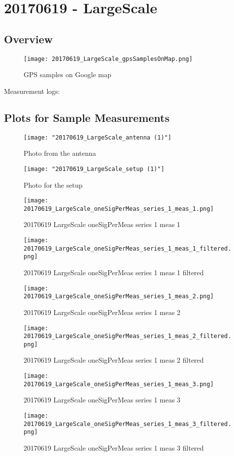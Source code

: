 \section{20170619 - LargeScale}
\subsection{Overview}
\begin{figure}[ht] \caption{GPS samples on Google map}
\texttt{[image: 20170619\_LargeScale\_gpsSamplesOnMap.png]}\centering\end{figure}
\begin{minipage}{\textwidth} Measurement logs:

 \end{minipage}
\clearpage
\subsection{Plots for Sample Measurements}
\begin{figure}[ht] \caption{Photo from the antenna}
\texttt{[image: "20170619\_LargeScale\_antenna (1)"]}\centering\end{figure}
\begin{figure}[ht] \caption{Photo for the setup}
\texttt{[image: "20170619\_LargeScale\_setup (1)"]}\centering\end{figure}
\begin{figure}[ht] \caption{20170619 LargeScale oneSigPerMeas series 1 meas 1}
\texttt{[image: 20170619\_LargeScale\_oneSigPerMeas\_series\_1\_meas\_1.png]}\centering\end{figure}
\begin{figure}[ht] \caption{20170619 LargeScale oneSigPerMeas series 1 meas 1 filtered}
\texttt{[image: 20170619\_LargeScale\_oneSigPerMeas\_series\_1\_meas\_1\_filtered.png]}\centering\end{figure}
\begin{figure}[ht] \caption{20170619 LargeScale oneSigPerMeas series 1 meas 2}
\texttt{[image: 20170619\_LargeScale\_oneSigPerMeas\_series\_1\_meas\_2.png]}\centering\end{figure}
\begin{figure}[ht] \caption{20170619 LargeScale oneSigPerMeas series 1 meas 2 filtered}
\texttt{[image: 20170619\_LargeScale\_oneSigPerMeas\_series\_1\_meas\_2\_filtered.png]}\centering\end{figure}
\begin{figure}[ht] \caption{20170619 LargeScale oneSigPerMeas series 1 meas 3}
\texttt{[image: 20170619\_LargeScale\_oneSigPerMeas\_series\_1\_meas\_3.png]}\centering\end{figure}
\begin{figure}[ht] \caption{20170619 LargeScale oneSigPerMeas series 1 meas 3 filtered}
\texttt{[image: 20170619\_LargeScale\_oneSigPerMeas\_series\_1\_meas\_3\_filtered.png]}\centering\end{figure}
\clearpage
